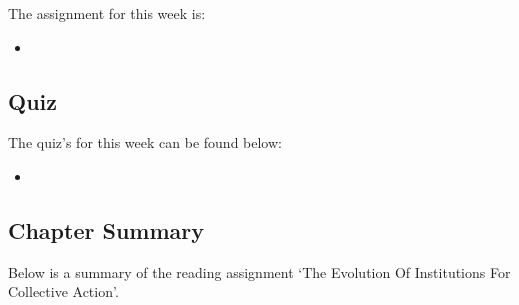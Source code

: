 The assignment for this week is:

\begin{itemize}
    \item {}
\end{itemize}

\subsection{Quiz}

The quiz's for this week can be found below:

\begin{itemize}
    \item {}
\end{itemize}

\subsection{Chapter Summary}

Below is a summary of the reading assignment `The Evolution Of Institutions For Collective Action'.

